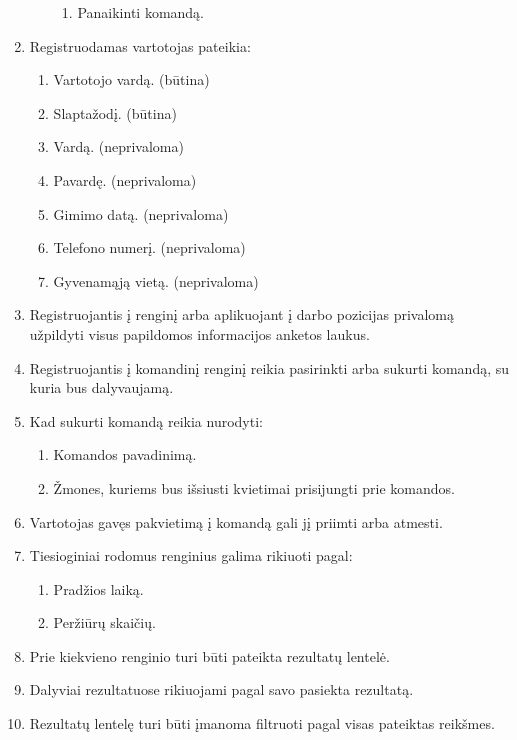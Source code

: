 \documentclass{VUMIFPSkursinis}
\begin{document}
\begin{enumerate}[label=\textbf{FR\arabic*}]
\begin{enumerate}[label*=\textbf{.\arabic*}]
\begin{enumerate}[label*=\textbf{.\arabic*}]
							\item Panaikinti komandą.
						\end{enumerate}
					\end{enumerate}				
				\item Registruodamas vartotojas pateikia:
					\begin{enumerate}[label*=\textbf{.\arabic*}]
						\item Vartotojo vardą. (būtina)
						\item Slaptažodį. (būtina)
						\item Vardą. (neprivaloma)
						\item Pavardę. (neprivaloma)
						\item Gimimo datą. (neprivaloma)
						\item Telefono numerį. (neprivaloma)
						\item Gyvenamąją vietą. (neprivaloma)
					\end{enumerate}
				\item Registruojantis į renginį arba aplikuojant į darbo pozicijas privalomą užpildyti visus papildomos informacijos anketos laukus.
				\item Registruojantis į komandinį renginį reikia pasirinkti arba sukurti komandą, su kuria bus dalyvaujamą.
				\item Kad sukurti komandą reikia nurodyti:
					\begin{enumerate}[label*=\textbf{.\arabic*}]
						\item Komandos pavadinimą.
						\item Žmones, kuriems bus išsiusti kvietimai prisijungti prie komandos.
					\end{enumerate}
				\item Vartotojas gavęs pakvietimą į komandą gali jį priimti arba atmesti.
				\item Tiesioginiai rodomus renginius galima rikiuoti pagal:
					\begin{enumerate}[label*=\textbf{.\arabic*}]
						\item Pradžios laiką.
						\item Peržiūrų skaičių.
					\end{enumerate}
				\item Prie kiekvieno renginio turi būti pateikta rezultatų lentelė.
				\item Dalyviai rezultatuose rikiuojami pagal savo pasiekta rezultatą.
				\item Rezultatų lentelę turi būti įmanoma filtruoti pagal visas pateiktas reikšmes.

\end{enumerate}
\end{document}
